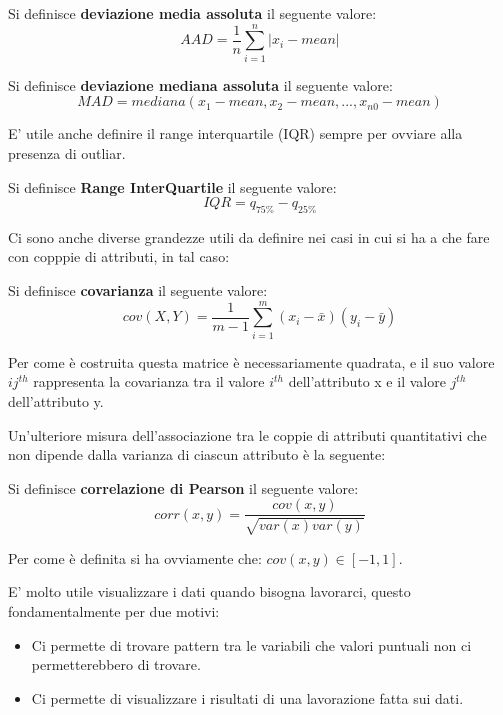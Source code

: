 \begin{defn}
	Si definisce \textbf{deviazione media assoluta} il seguente valore:
	\[ AAD =  \frac{1}{n}\sum_{i=1}^{n}|x_i- mean|\]
\end{defn}

\begin{defn}
	Si definisce \textbf{deviazione mediana assoluta} il seguente valore:
	\[ MAD = mediana(x_{1}-mean, x_{2}-mean, ..., x_{n0}-mean )\]
\end{defn}

E' utile anche definire il range interquartile (IQR) sempre per ovviare alla presenza di outliar.

\begin{defn}
	Si definisce \textbf{Range InterQuartile} il seguente valore:
	\[ IQR = q_{75\%} - q_{25\%}\]
\end{defn}

Ci sono anche diverse grandezze utili da definire nei casi in cui si ha a che fare con copppie di attributi, in tal caso:

\begin{defn}
	Si definisce \textbf{covarianza} il seguente valore:
\[cov(X,Y) = \frac{1}{m -1}\sum_{i = 1}^{m} (x_{i} - \bar{x})(y_{i} - \bar{y})\]
\end{defn}

Per come è costruita questa matrice è necessariamente quadrata, e il suo valore $ij ^{th}$ rappresenta la covarianza tra il valore $i^{th}$ dell'attributo x e il valore $j^{th}$ dell'attributo y.

Un'ulteriore misura dell'associazione tra le coppie di attributi quantitativi che non dipende dalla varianza di ciascun attributo è la seguente:

\begin{defn}
	Si definisce \textbf{correlazione di Pearson} il seguente valore:
	\[ corr(x,y) = \frac{cov(x,y)}{\sqrt{var(x)var(y)}}\]
\end{defn} 
Per come è definita si ha ovviamente che: $cov(x,y) \in [-1,1]$.

E' molto utile visualizzare i dati quando bisogna lavorarci, questo fondamentalmente per due motivi:
\begin{itemize}
	\item Ci permette di trovare pattern tra le variabili che valori puntuali non ci permetterebbero di trovare.
	\item Ci permette di visualizzare i risultati di una lavorazione fatta sui dati.
\end{itemize}

